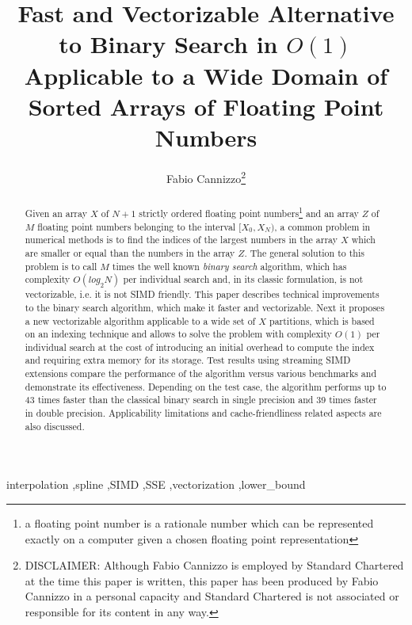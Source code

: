 \documentclass[preprint,1p,times]{elsarticle}
\begin{document}
\newcommand {\curle}[1]{ \left \{      #1 \right \}      }
\newcommand {\floor}[1]{ \left \lfloor #1 \right \rfloor }
\newcommand {\ceil} [1] { \left \lceil  #1 \right \rceil  }
\newcommand {\fin}  {\textbf{input:\;}}
\newcommand {\fout} {\textbf{output:\;}}
\newcommand {\next} [1] {\phi\left(#1\right)}

\begin{frontmatter}
\title{Fast and Vectorizable Alternative to Binary Search in $O(1)$ Applicable to a Wide Domain of Sorted Arrays of Floating Point Numbers}

\author{Fabio Cannizzo\footnote{DISCLAIMER: Although Fabio Cannizzo is employed by Standard Chartered at the time this paper is written, this paper has been produced by Fabio Cannizzo in a personal capacity and Standard Chartered is not associated or responsible for its content in any way.}}

\begin{abstract}
Given an array $X$ of $N+1$ strictly ordered floating point numbers\footnote{a floating point number is a rationale number which can be represented exactly on a computer given a chosen floating point representation} and an array $Z$ of $M$ floating point numbers belonging to the interval $[X_0,X_N)$, a common problem in numerical methods is to find the indices of the largest numbers in the array $X$ which are smaller or equal than the numbers in the array $Z$. The general solution to this problem is to call $M$ times the well known \textit{binary search} algorithm, which has complexity $O(log_2 N)$ per individual search and, in its classic formulation, is not vectorizable, i.e. it is not SIMD friendly. This paper describes technical improvements to the binary search algorithm, which make it faster and vectorizable. Next it proposes a new vectorizable algorithm applicable to a wide set of $X$ partitions, which is based on an indexing technique and allows to solve the problem with complexity $O(1)$ per individual search at the cost of introducing an initial overhead to compute the index and requiring extra memory for its storage. Test results using streaming SIMD extensions compare the performance of the algorithm versus various benchmarks and demonstrate its effectiveness. Depending on the test case, the algorithm performs up to 43 times faster than the classical binary search in single precision and 39 times faster in double precision. Applicability limitations and cache-friendliness related aspects are also discussed.
\end{abstract}

\begin{keyword}
interpolation \sep spline \sep SIMD \sep SSE \sep vectorization \sep lower\_bound
\end{keyword}

\end{frontmatter}
\end{document}

